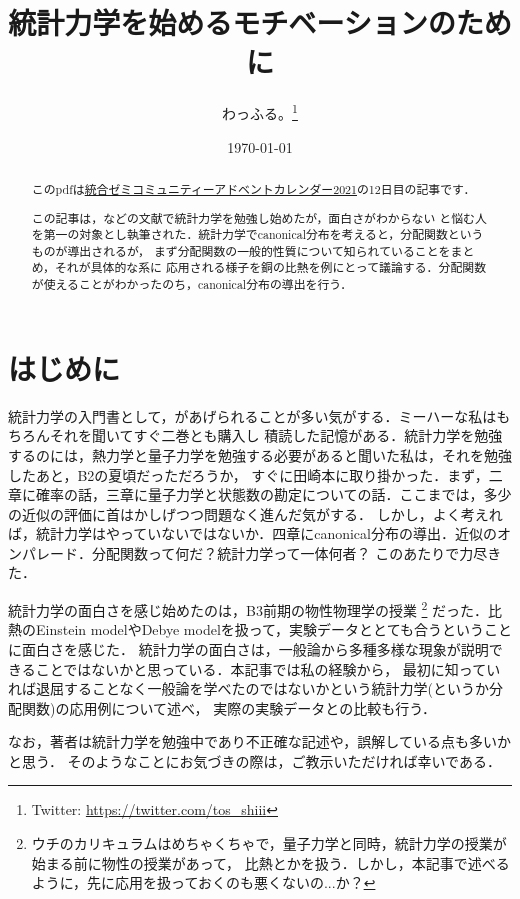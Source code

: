 \documentclass[dvipdfmx,a4paper]{jsarticle}
\title{統計力学を始めるモチベーションのために}
\author{わっふる。\footnote{Twitter: \url{https://twitter.com/tos_shiii}}}
\date{\today}
\theoremstyle{break}
\numberwithin{equation}{section}
\begin{document}
\maketitle

\begin{abstract}
    このpdfは\href{https://adventar.org/calendars/6268}{統合ゼミコミュニティーアドベントカレンダー2021}の12日目の記事です．
    
    この記事は，\cite{Tasaki_statmech}などの文献で統計力学を勉強し始めたが，面白さがわからない
    と悩む人を第一の対象とし執筆された．統計力学でcanonical分布を考えると，分配関数というものが導出されるが，
    まず分配関数の一般的性質について知られていることをまとめ，それが具体的な系に
    応用される様子を銅の比熱を例にとって議論する．分配関数が使えることがわかったのち，canonical分布の導出を行う．
\end{abstract}
\section{はじめに}
    統計力学の入門書として，\cite{Tasaki_statmech}があげられることが多い気がする．ミーハーな私はもちろんそれを聞いてすぐ二巻とも購入し
    積読した記憶がある．統計力学を勉強するのには，熱力学と量子力学を勉強する必要があると聞いた私は，それを勉強したあと，B2の夏頃だっただろうか，
    すぐに田崎本に取り掛かった．まず，二章に確率の話，三章に量子力学と状態数の勘定についての話．ここまでは，多少の近似の評価に首はかしげつつ問題なく進んだ気がする．
    しかし，よく考えれば，統計力学はやっていないではないか．四章にcanonical分布の導出．近似のオンパレード．分配関数って何だ？統計力学って一体何者？
    このあたりで力尽きた．

    統計力学の面白さを感じ始めたのは，B3前期の物性物理学の授業
    \footnote{ウチのカリキュラムはめちゃくちゃで，量子力学と同時，統計力学の授業が始まる前に物性の授業があって，
    比熱とかを扱う．しかし，本記事で述べるように，先に応用を扱っておくのも悪くないの...か？}
    だった．比熱のEinstein modelやDebye modelを扱って，実験データととても合うということに面白さを感じた．
    統計力学の面白さは，一般論から多種多様な現象が説明できることではないかと思っている．本記事では私の経験から，
    最初に知っていれば退屈することなく一般論を学べたのではないかという統計力学(というか分配関数)の応用例について述べ，
    実際の実験データ\cite{doi:10.1063/1.555728}との比較も行う．

    なお，著者は統計力学を勉強中であり不正確な記述や，誤解している点も多いかと思う．
    そのようなことにお気づきの際は，ご教示いただければ幸いである．


\end{document}
